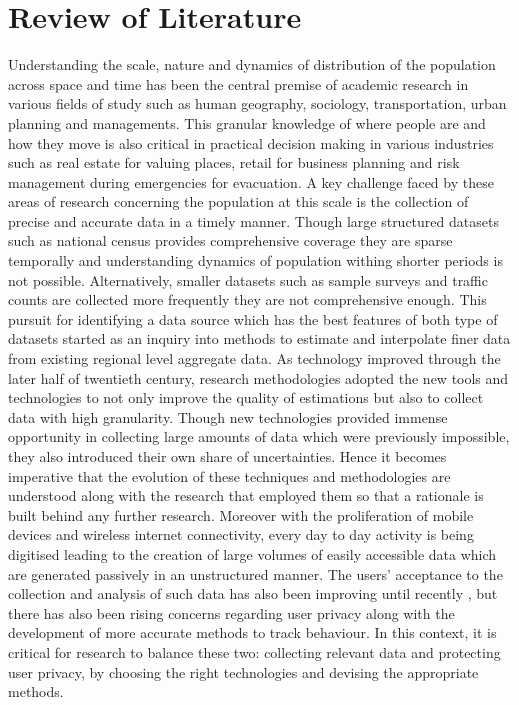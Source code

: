 \chapter{Review of Literature}\label{chapter:literature}

Understanding the scale, nature and dynamics of distribution of the population across space and time has been the central premise of academic research in various fields of study such as human geography, sociology, transportation, urban planning and managements.
This granular knowledge of where people are and how they move is also critical in practical decision making in various industries such as real estate for valuing places, retail for business planning and risk management during emergencies for evacuation.
A key challenge faced by these areas of research concerning the population at this scale is the collection of precise and accurate data in a timely manner.
Though large structured datasets such as national census provides comprehensive coverage they are sparse temporally and understanding dynamics of population withing shorter periods is not possible.
Alternatively, smaller datasets such as sample surveys and traffic counts are collected more frequently they are not comprehensive enough. 
This pursuit for identifying a data source which has the best features of both type of datasets started as an inquiry into methods to estimate and interpolate finer data from existing regional level aggregate data.
As technology improved through the later half of twentieth century, research methodologies adopted the new tools and technologies to not only improve the quality of estimations but also to collect data with high granularity.
Though new technologies provided immense opportunity in collecting large amounts of data which were previously impossible, they also introduced their own share of uncertainties.
Hence it becomes imperative that the evolution of these techniques and methodologies are understood along with the research that employed them so that a rationale is built behind any further research.
Moreover with the proliferation of mobile devices and wireless internet connectivity, every day to day activity is being digitised leading to the creation of large volumes of easily accessible data which are generated passively in an unstructured manner.
The users' acceptance to the collection and analysis of such data has also been improving until recently \cite{kobsa2014}, but there has also been rising concerns regarding user privacy along with the development of more accurate methods to track behaviour.
In this context, it is critical for research to balance these two: collecting relevant data and protecting user privacy, by choosing the right technologies and devising the appropriate methods.


